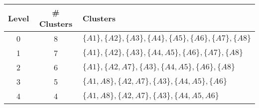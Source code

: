 \documentclass[aspectratio=169, 10pt]{beamer}
\begin{document}
\begin{frame}[t]
    \begin{table}[]
        \scriptsize
        \begin{tabular}{c|c|l}
        Level & \# Clusters & Clusters \\ \hline
        0     & 8           & $\{A1\}, \{A2\}, \{A3\}, \{A4\}, \{A5\}, \{A6\}, \{A7\}, \{A8\}$\\
        1     & 7           & $\{A1\}, \{A2\}, \{A3\}, \{A4, A5\}, \{A6\}, \{A7\}, \{A8\}$\\
        2     & 6           & $\{A1\}, \{A2, A7\}, \{A3\}, \{A4, A5\}, \{A6\}, \{A8\}$\\
        3     & 5           & $\{A1, A8\}, \{A2, A7\}, \{A3\}, \{A4, A5\}, \{A6\}$\\
        4     & 4           & $\{A1, A8\}, \{A2, A7\}, \{A3\}, \{A4, A5, A6\}$\\
        \end{tabular}
    \end{table}


\end{frame}
\end{document}
